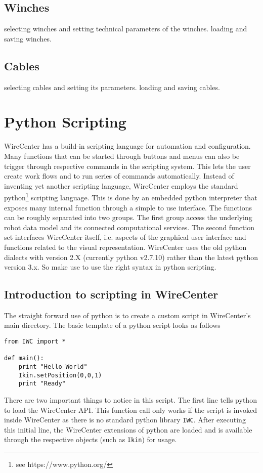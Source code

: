 \documentclass[11pt,a4paper,onepage,openany]{book}
\begin{document}
\section{Winches}
selecting winches and setting technical parameters of the winches. loading and
saving winches.

\section{Cables}
selecting cables and setting its parameters. loading and saving cables.

\chapter{Python Scripting}\label{sec:PythonScripting}%
WireCenter has a build-in scripting language for automation and configuration.
Many functions that can be started through buttons and menus can also be trigger
through respective commands in the scripting system. This lets the user create
work flows and to run series of commands automatically. Instead of inventing yet
another scripting language, WireCenter employs the standard python\footnote{see
https://www.python.org/} scripting language. This is done by an embedded python
interpreter that exposes many internal function through a simple to use interface.
The functions can be roughly separated into two groups. The first group access
the underlying robot data model and its connected computational services. The
second function set interfaces WireCenter itself, i.e. aspects of the graphical
user interface and functions related to the visual representation. WireCenter
uses the old python dialects with version 2.X (currently  python v2.7.10) rather
than the latest python version 3.x. So make use to use the right syntax in python
scripting.

\section{Introduction to scripting in WireCenter}
The straight forward use of python is to create a custom script in WireCenter's
main directory. The basic template of a python script looks as follows
\begin{verbatim}
from IWC import *

def main():
    print "Hello World"
	Ikin.setPosition(0,0,1)
    print "Ready"	
\end{verbatim}
There are two important things to notice in this script. The first line tells python to load the WireCenter API. This function call only works if the script is invoked inside WireCenter as there is no standard python library \texttt{IWC}. After executing this initial line, the WireCenter extensions of python are loaded and is available through the respective objects (such as \texttt{Ikin}) for usage.
\end{document}
